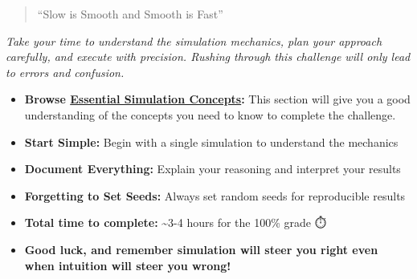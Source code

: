 \documentclass[
  letterpaper,
  DIV=11,
  numbers=noendperiod]{scrartcl}
\providecommand{\tightlist}{%
  \setlength{\itemsep}{0pt}\setlength{\parskip}{0pt}}
\theoremstyle{definition}
\theoremstyle{remark}
\begin{document}
\begin{tcolorbox}[enhanced jigsaw, titlerule=0mm, colbacktitle=quarto-callout-note-color!10!white, coltitle=black, leftrule=.75mm, colback=white, colframe=quarto-callout-note-color-frame, breakable, rightrule=.15mm, toprule=.15mm, title=\textcolor{quarto-callout-note-color}{\faInfo}\hspace{0.5em}{🎯 Navy SEALs Motto}, bottomrule=.15mm, opacityback=0, bottomtitle=1mm, left=2mm, toptitle=1mm, arc=.35mm, opacitybacktitle=0.6]

\begin{quote}
``Slow is Smooth and Smooth is Fast''
\end{quote}

\emph{Take your time to understand the simulation mechanics, plan your
approach carefully, and execute with precision. Rushing through this
challenge will only lead to errors and confusion.}

\end{tcolorbox}

\begin{itemize}
\tightlist
\item
  \textbf{Browse \href{@sec-simulation-concepts}{Essential Simulation
  Concepts}:} This section will give you a good understanding of the
  concepts you need to know to complete the challenge.
\item
  \textbf{Start Simple:} Begin with a single simulation to understand
  the mechanics
\item
  \textbf{Document Everything:} Explain your reasoning and interpret
  your results
\item
  \textbf{Forgetting to Set Seeds:} Always set random seeds for
  reproducible results
\item
  \textbf{Total time to complete:} \textasciitilde3-4 hours for the
  100\% grade ⏱️
\item
  \textbf{Good luck, and remember simulation will steer you right even
  when intuition will steer you wrong!} 🎲
\end{itemize}
\end{document}
